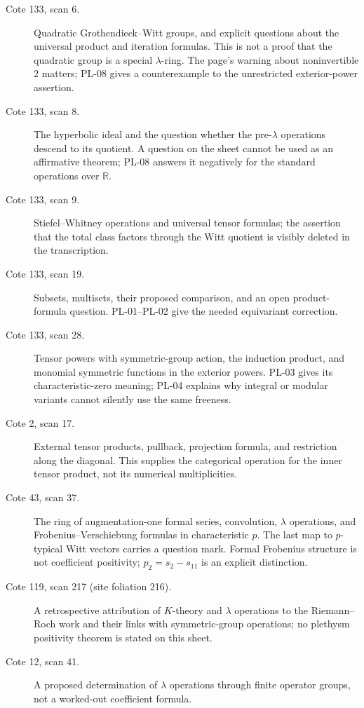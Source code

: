 \documentclass[11pt,a4paper]{article}
\begin{document}
\begin{description}
\item[Cote 133, scan 6.] Quadratic Grothendieck--Witt groups, and explicit
questions about the universal product and iteration formulas. This is not
a proof that the quadratic group is a special $\lambda$-ring. The page's
warning about noninvertible $2$ matters; PL-08 gives a counterexample to
the unrestricted exterior-power assertion.
\item[Cote 133, scan 8.] The hyperbolic ideal and the question whether the
pre-$\lambda$ operations descend to its quotient. A question on the sheet
cannot be used as an affirmative theorem; PL-08 answers it negatively
for the standard operations over $\mathbb R$.
\item[Cote 133, scan 9.] Stiefel--Whitney operations and universal tensor
formulas; the assertion that the total class factors through the Witt
quotient is visibly deleted in the transcription.
\item[Cote 133, scan 19.] Subsets, multisets, their proposed comparison, and
an open product-formula question. PL-01--PL-02 give the needed equivariant
correction.
\item[Cote 133, scan 28.] Tensor powers with symmetric-group action, the
induction product, and monomial symmetric functions in the exterior powers.
PL-03 gives its characteristic-zero meaning; PL-04 explains why integral
or modular variants cannot silently use the same freeness.
\item[Cote 2, scan 17.] External tensor products, pullback, projection
formula, and restriction along the diagonal. This supplies the categorical
operation for the inner tensor product, not its numerical multiplicities.
\item[Cote 43, scan 37.] The ring of augmentation-one formal series,
convolution, $\lambda$ operations, and Frobenius--Verschiebung formulas in
characteristic $p$. The last map to $p$-typical Witt vectors carries a
question mark. Formal Frobenius structure is not coefficient positivity;
$p_2=s_2-s_{11}$ is an explicit distinction.
\item[Cote 119, scan 217 (site foliation 216).] A retrospective attribution
of $K$-theory and $\lambda$ operations to the Riemann--Roch work and their
links with symmetric-group operations; no plethysm positivity theorem is
stated on this sheet.
\item[Cote 12, scan 41.] A proposed determination of $\lambda$ operations
through finite operator groups, not a worked-out coefficient formula.

\end{description}
\end{document}
